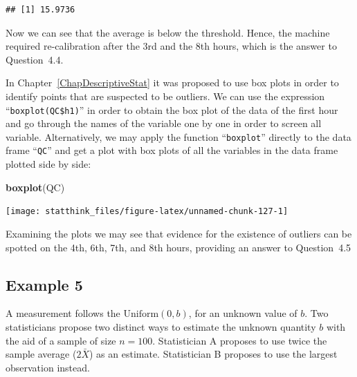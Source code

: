 \documentclass[]{krantz}
\makeatletter
\newenvironment{Shaded}{\begin{snugshade}}{\end{snugshade}}
\newcommand{\KeywordTok}[1]{\textcolor[rgb]{0.13,0.29,0.53}{\textbf{#1}}}
\newcommand{\OperatorTok}[1]{\textcolor[rgb]{0.81,0.36,0.00}{\textbf{#1}}}
\newcommand{\NormalTok}[1]{#1}
\newenvironment{kframe}{%
\medskip{}
\setlength{\fboxsep}{.8em}
 \def\at@end@of@kframe{}%
 \ifinner\ifhmode%
  \def\at@end@of@kframe{\end{minipage}}%
  \begin{minipage}{\columnwidth}%
 \fi\fi%
 \def\FrameCommand##1{\hskip\@totalleftmargin \hskip-\fboxsep
 \colorbox{shadecolor}{##1}\hskip-\fboxsep
     \hskip-\linewidth \hskip-\@totalleftmargin \hskip\columnwidth}%
 \MakeFramed {\advance\hsize-\width
   \@totalleftmargin\z@ \linewidth\hsize
   \@setminipage}}%
 {\par\unskip\endMakeFramed%
 \at@end@of@kframe}
\renewenvironment{Shaded}{\begin{kframe}}{\end{kframe}}
\theoremstyle{definition}
\theoremstyle{definition}
\theoremstyle{definition}
\theoremstyle{remark}
\makeatother
\begin{document}
\begin{Shaded}
\end{Shaded}

\begin{verbatim}
## [1] 15.9736
\end{verbatim}

Now we can see that the average is below the threshold. Hence, the
machine required re-calibration after the 3rd and the 8th hours, which
is the answer to Question~4.4.

In Chapter~\ref{ChapDescriptiveStat} it was proposed to use box plots in
order to identify points that are suspected to be outliers. We can use
the expression ``\texttt{boxplot(QC\$h1)}'' in order to obtain the box
plot of the data of the first hour and go through the names of the
variable one by one in order to screen all variable. Alternatively, we
may apply the function ``\texttt{boxplot}'' directly to the data frame
``\texttt{QC}'' and get a plot with box plots of all the variables in
the data frame plotted side by side:

\begin{Shaded}
\begin{Highlighting}[]
\KeywordTok{boxplot}\NormalTok{(QC)}
\end{Highlighting}
\end{Shaded}

\begin{center}\texttt{[image: statthink\_files/figure-latex/unnamed-chunk-127-1]} \end{center}

Examining the plots we may see that evidence for the existence of
outliers can be spotted on the 4th, 6th, 7th, and 8th hours, providing
an answer to Question~4.5

\subsection{Example 5}\label{example-5}

A measurement follows the \(\mbox{Uniform}(0,b)\), for an unknown value
of \(b\). Two statisticians propose two distinct ways to estimate the
unknown quantity \(b\) with the aid of a sample of size \(n=100\).
Statistician A proposes to use twice the sample average (\(2 \bar X\))
as an estimate. Statistician B proposes to use the largest observation
instead.
\end{document}
